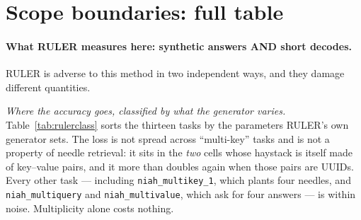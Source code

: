 %
%
%

\section{Scope boundaries: full table}\label{app:limits}

\paragraph{What RULER measures here: synthetic answers AND short decodes.}
RULER is adverse to this method in two independent ways, and they damage
different quantities.

\emph{Where the accuracy goes, classified by what the generator varies.}
Table~\ref{tab:rulerclass} sorts the thirteen tasks by the parameters RULER's
own generator sets. The loss is not spread across ``multi-key'' tasks and is
not a property of needle retrieval: it sits in the \emph{two} cells whose
haystack is itself made of key--value pairs, and it more than doubles again
when those pairs are UUIDs. Every other task --- including
\texttt{niah\_multikey\_1}, which plants four needles, and
\texttt{niah\_multiquery} and \texttt{niah\_multivalue}, which ask for four
answers --- is within noise. Multiplicity alone costs nothing.



